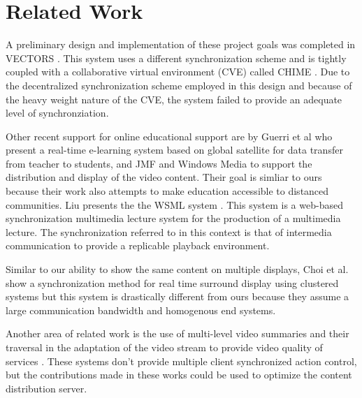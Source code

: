 \documentclass{sig-alternate}
\begin{document}
\section{Related Work} \label{related}

A preliminary design and implementation of these project goals was
completed in VECTORS \cite{VECTORS}.  This system uses a different
synchronization scheme and is tightly coupled with a collaborative
virtual environment (CVE) called CHIME \cite{CHIME}.  Due to the
decentralized synchronization scheme employed in this design and
because of the heavy weight nature of the CVE, the system failed to
provide an adequate level of synchronziation.

Other recent support for online educational support are by Guerri et
al who present a real-time e-learning system based on global satellite
for data transfer from teacher to students, and JMF and Windows Media
\cite{GUERRI} to support the distribution and display of the video
content.  Their goal is simliar to ours because their work also
attempts to make education accessible to distanced communities.  Liu
presents the the WSML system \cite{LIU2}.  This system is a web-based
synchronization multimedia lecture system for the production of a
multimedia lecture.  The synchronization referred to in this context
is that of intermedia communication to provide a replicable playback
environment.

Similar to our ability to show the same content on multiple displays,
Choi et al. show a synchronization method for real time surround
display using clustered systems \cite{CHOI} but this system is
drastically different from ours because they assume a large
communication bandwidth and homogenous end systems.

Another area of related work is the use of multi-level video summaries
and their traversal in the adaptation of the video stream to provide
video quality of services
\cite{CUI,KRASIC,LEI,NEUMANN,SHIPMAN,TAN,THAKUR}.  These systems don't
provide multiple client synchronized action control, but the
contributions made in these works could be used to optimize the
content distribution server.
\end{document}
